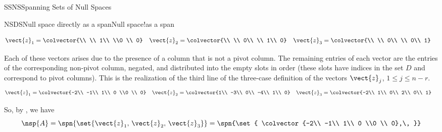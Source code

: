 \begin{subsect}{SSNS}{Spanning Sets of Null Spaces}
\begin{example}{NSDS}{Null space directly as a span}{Null space!as a span}
\begin{para}
%
\begin{align*}
\vect{z}_1&=\colvector{\\ \\ 1\\ \\0 \\ 0}
&
\vect{z}_2&=\colvector{\\ \\ 0\\ \\ 1\\ 0}
&
\vect{z}_3&=\colvector{\\ \\ 0\\ \\ 0\\ 1}
\end{align*}
\end{para}
%
\begin{para}Each of these vectors arises due to the presence of a column that is not a pivot column.  The remaining entries of each vector are the entries of the corresponding non-pivot column, negated, and distributed into the empty slots in order (these slots have indices in the set $D$ and correspond to pivot columns).  This is the realization of the third line of the three-case definition of the vectors $\vect{z}_j$, $1\leq j\leq n-r$.
%
\begin{align*}
\vect{z}_1&=\colvector{-2\\ -1\\ 1\\  0 \\0 \\ 0}
&
\vect{z}_2&=\colvector{1\\ -3\\ 0\\ -4\\ 1\\ 0}
&
\vect{z}_3&=\colvector{-2\\ 1\\ 0\\ 2\\ 0\\ 1}
\end{align*}
\end{para}
%
\begin{para}So, by , we have
%
\begin{equation*}
\nsp{A}
=
\spn{\set{\vect{z}_1,\,\vect{z}_2,\,\vect{z}_3}}
=
\spn{\set{
\colvector{-2\\ -1\\ 1\\  0 \\0 \\ 0},\,
}}
\end{equation*}
\end{para}
\end{example}
\end{subsect}
